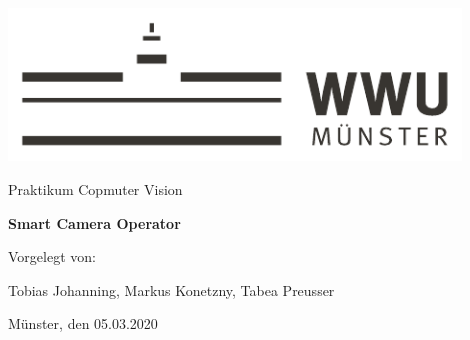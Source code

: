 
\begin{centering}
\vspace{4cm}
\includegraphics[width=12cm]{./img/wwu-logo-neu.pdf}

\vspace{2cm} 

{\large
	Praktikum Copmuter Vision\\[0.5cm]
}

{\LARGE
	\textbf{Smart Camera Operator}\\[2cm]
}


{\large
	Vorgelegt von:\\[0.5cm]
}

{ \large
	Tobias Johanning, Markus Konetzny, Tabea Preusser \\[1cm]
}

{\large
	Münster, den 05.03.2020\\[1cm]
}



\end{centering}
\vfill


 

